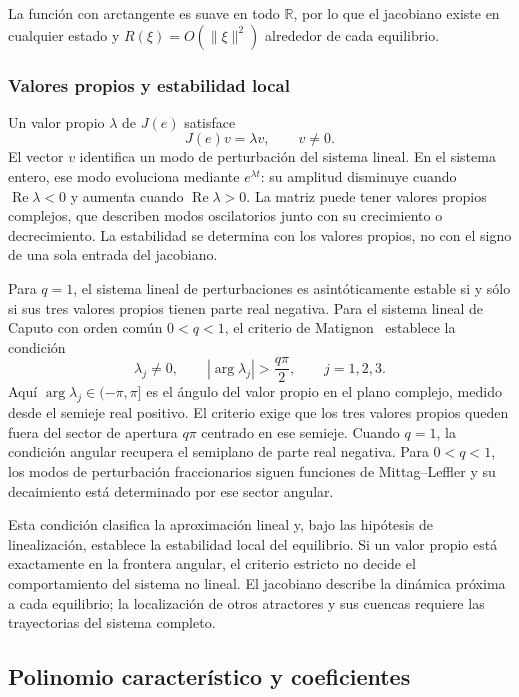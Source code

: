 La función con arctangente es suave en todo \(\mathbb R\), por lo que
el jacobiano existe en cualquier estado y \(R(\xi)=O(\lVert\xi\rVert^2)\)
alrededor de cada equilibrio.

\subsubsection{Valores propios y estabilidad local}

Un valor propio \(\lambda\) de \(J(e)\) satisface
\[
J(e)v=\lambda v,\qquad v\neq0.
\]
El vector \(v\) identifica un modo de perturbación del sistema lineal.
En el sistema entero, ese modo evoluciona mediante \(e^{\lambda t}\):
su amplitud disminuye cuando \(\operatorname{Re}\lambda<0\) y aumenta
cuando \(\operatorname{Re}\lambda>0\). La matriz puede tener valores propios
complejos, que describen modos oscilatorios junto con su crecimiento o
decrecimiento. La estabilidad se determina con los valores propios, no con
el signo de una sola entrada del jacobiano.

Para \(q=1\), el sistema lineal de perturbaciones es asintóticamente estable
si y sólo si sus tres valores propios tienen parte real negativa. Para el
sistema lineal de Caputo con orden común \(0<q<1\), el criterio de
Matignon~\cite{Matignon1996} establece la condición
\[
\lambda_j\neq0,\qquad
|\arg\lambda_j|>\frac{q\pi}{2},\qquad j=1,2,3.
\]
Aquí \(\arg\lambda_j\in(-\pi,\pi]\) es el ángulo del valor propio en el
plano complejo, medido desde el semieje real positivo. El criterio exige
que los tres valores propios queden fuera del sector de apertura \(q\pi\)
centrado en ese semieje. Cuando \(q=1\), la condición angular recupera el
semiplano de parte real negativa. Para \(0<q<1\), los modos de perturbación
fraccionarios siguen funciones de Mittag--Leffler y su decaimiento está
determinado por ese sector angular.

Esta condición clasifica la aproximación lineal y, bajo las hipótesis de
linealización, establece la estabilidad local del equilibrio. Si un valor
propio está exactamente en la frontera angular, el criterio estricto no
decide el comportamiento del sistema no lineal. El jacobiano describe la
dinámica próxima a cada equilibrio; la localización de otros atractores y
sus cuencas requiere las trayectorias del sistema completo.

\fi
\ifnum{}\relax
\subsection{Polinomio característico y coeficientes}
\label{app:polinomio_caracteristico}

